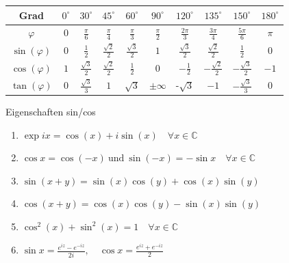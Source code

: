 \begin{center}
    \renewcommand{\arraystretch}{1.3} %
    \setlength{\tabcolsep}{4pt}
    \begin{tabular}{|c|c|c|c|c|c|c|c|c|c|}
        \hline
        Grad            & $0^\circ$ & $30^\circ$           & $45^\circ$           & $60^\circ$           & $90^\circ$      & $120^\circ$          & $135^\circ$           & $150^\circ$           & $180^\circ$ \\
        \hline
        $\varphi$       & $0$       & $\frac{\pi}{6}$      & $\frac{\pi}{4}$      & $\frac{\pi}{3}$      & $\frac{\pi}{2}$ & $\frac{2\pi}{3}$     & $\frac{3\pi}{4}$      & $\frac{5\pi}{6}$      & $\pi$       \\
        \hline
        $\sin(\varphi)$ & $0$       & $\frac{1}{2}$        & $\frac{\sqrt{2}}{2}$ & $\frac{\sqrt{3}}{2}$ & $1$             & $\frac{\sqrt{3}}{2}$ & $\frac{\sqrt{2}}{2}$  & $\frac{1}{2}$         & $0$         \\
        \hline
        $\cos(\varphi)$ & $1$       & $\frac{\sqrt{3}}{2}$ & $\frac{\sqrt{2}}{2}$ & $\frac{1}{2}$        & $0$             & $-\frac{1}{2}$       & $-\frac{\sqrt{2}}{2}$ & $-\frac{\sqrt{3}}{2}$ & $-1$        \\
        \hline
        $\tan(\varphi)$ & $0$       & $\frac{\sqrt{3}}{3}$ & $1$                  & $\sqrt{3}$           & $\pm \infty$    & -$\sqrt{3}$          & $-1$                  & $-\frac{\sqrt{3}}{3}$ & $0$         \\
        \hline
    \end{tabular}
\end{center}





\begin{theorem}{Eigenschaften sin/cos}
    \begin{enumerate}
        \item $\exp ix = \cos(x) + i \sin(x) \quad \forall x \in \mathbb{C}$
        \item $\cos x = \cos(-x) ~\text{und}~ \sin(-x) = -\sin x \quad\forall x \in \mathbb{C}$
        \item $\sin(x + y) = \sin(x)\cos(y) + \cos(x)\sin(y)$
        \item $\cos(x + y) = \cos(x)\cos(y) - \sin(x)\sin(y)$
        \item $\cos^2(x) + \sin^2(x) = 1 \quad \forall x \in \mathbb{C}$ 
        \item $\sin x = \frac{e^{iz} - e^{-iz}}{2i}, \quad \cos x = \frac{e^{iz} + e^{-iz}}{2}$
    \end{enumerate} 
 \end{theorem}
 
